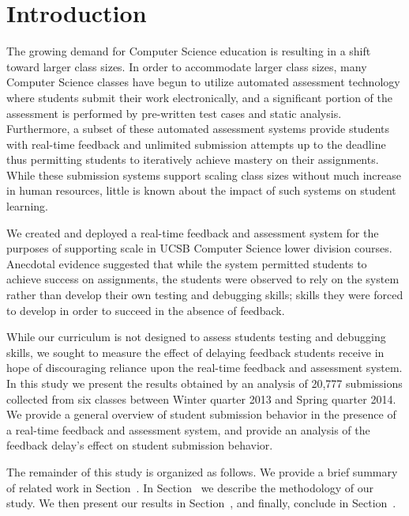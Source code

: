\section{Introduction}
The growing demand for Computer Science education is resulting in a shift
toward larger class sizes. In order to accommodate larger class sizes, many
Computer Science classes have begun to utilize automated assessment technology
where students submit their work electronically, and a significant portion of
the assessment is performed by pre-written test cases and static
analysis. Furthermore, a subset of these automated assessment systems provide
students with real-time feedback and unlimited submission attempts up to the
deadline thus permitting students to iteratively achieve mastery on their
assignments. While these submission systems support scaling class sizes without
much increase in human resources, little is known about the impact of such
systems on student learning.

We created and deployed a real-time feedback and assessment system for the
purposes of supporting scale in UCSB Computer Science lower division
courses. Anecdotal evidence suggested that while the system permitted students
to achieve success on assignments, the students were observed to rely on the
system rather than develop their own testing and debugging skills; skills they
were forced to develop in order to succeed in the absence of feedback.

While our curriculum is not designed to assess students testing and debugging
skills, we sought to measure the effect of delaying feedback students receive
in hope of discouraging reliance upon the real-time feedback and assessment
system. In this study we present the results obtained by an analysis of 20,777
submissions collected from six classes between Winter quarter 2013 and Spring
quarter 2014. We provide a general overview of student submission behavior in
the presence of a real-time feedback and assessment system, and provide an
analysis of the feedback delay's effect on student submission behavior.

The remainder of this study is organized as follows. We provide a brief summary
of related work in Section~. In
Section~ we describe the methodology of our study. We
then present our results in Section~, and finally,
conclude in Section~.
